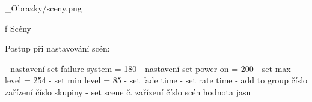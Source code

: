 






\medskip {}
\picw=16cm _Obrazky/sceny.png
\caption/f Scény
\medskip

Postup při nastavování scén:

- nastavení set failure system = 180
- nastavení set power on = 200
- set max level = 254
- set min level = 85
- set fade time
- set rate time
- add to group číslo zařízení číslo skupiny
- set scene č. zařízení číslo scén hodnota jasu











